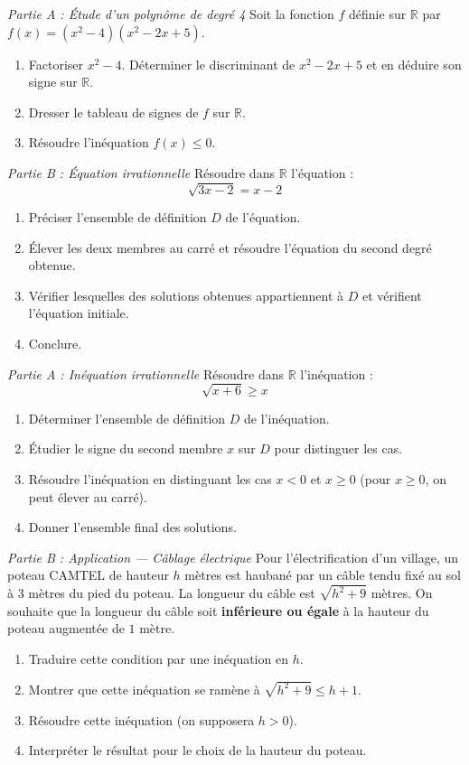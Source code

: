 \documentclass[11pt]{article}
\begin{document}
\begin{exercice}
\emph{Partie A : Étude d'un polynôme de degré 4}
Soit la fonction $f$ définie sur $\mathbb{R}$ par $f(x) = (x^2 - 4)(x^2 - 2x + 5)$.
\begin{enumerate}
    \item Factoriser $x^2 - 4$. Déterminer le discriminant de $x^2 - 2x + 5$ et en déduire son signe sur $\mathbb{R}$.
    \item Dresser le tableau de signes de $f$ sur $\mathbb{R}$.
    \item Résoudre l'inéquation $f(x) \le 0$.
\end{enumerate}

\emph{Partie B : Équation irrationnelle}
Résoudre dans $\mathbb{R}$ l'équation :
\[ \sqrt{3x - 2} = x - 2 \]
\begin{enumerate}
    \item Préciser l'ensemble de définition $D$ de l'équation.
    \item Élever les deux membres au carré et résoudre l'équation du second degré obtenue.
    \item Vérifier lesquelles des solutions obtenues appartiennent à $D$ et vérifient l'équation initiale.
    \item Conclure.
\end{enumerate}
\end{exercice}

\begin{exercice}
\emph{Partie A : Inéquation irrationnelle}
Résoudre dans $\mathbb{R}$ l'inéquation :
\[ \sqrt{x + 6} \ge x \]
\begin{enumerate}
    \item Déterminer l'ensemble de définition $D$ de l'inéquation.
    \item Étudier le signe du second membre $x$ sur $D$ pour distinguer les cas.
    \item Résoudre l'inéquation en distinguant les cas $x < 0$ et $x \ge 0$ (pour $x \ge 0$, on peut élever au carré).
    \item Donner l'ensemble final des solutions.
\end{enumerate}

\emph{Partie B : Application — Câblage électrique}
Pour l'électrification d'un village, un poteau CAMTEL de hauteur $h$ mètres est haubané par un câble tendu fixé au sol à $3$ mètres du pied du poteau. La longueur du câble est $\sqrt{h^2 + 9}$ mètres.
On souhaite que la longueur du câble soit \textbf{inférieure ou égale} à la hauteur du poteau augmentée de $1$ mètre.
\begin{enumerate}
    \item Traduire cette condition par une inéquation en $h$.
    \item Montrer que cette inéquation se ramène à $\sqrt{h^2 + 9} \le h + 1$.
    \item Résoudre cette inéquation (on supposera $h > 0$).
    \item Interpréter le résultat pour le choix de la hauteur du poteau.
\end{enumerate}
\end{exercice}
\end{document}

